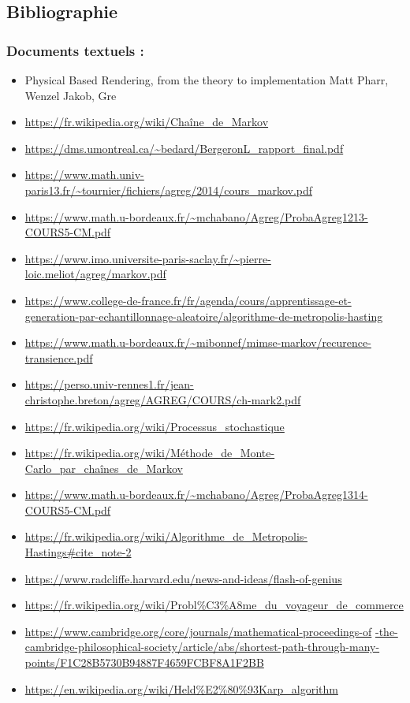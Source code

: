 \documentclass{article}
\begin{document}
\newpage
\subsection{Bibliographie}

\subsubsection{Documents textuels :}
\begin{itemize}
    \item Physical Based Rendering, from the theory to implementation Matt Pharr, Wenzel Jakob, Gre
    \item \url{https://fr.wikipedia.org/wiki/Chaîne_de_Markov}
    \item \url{https://dms.umontreal.ca/~bedard/BergeronL_rapport_final.pdf}
    \item \url{https://www.math.univ-paris13.fr/~tournier/fichiers/agreg/2014/cours_markov.pdf}
    \item \url{https://www.math.u-bordeaux.fr/~mchabano/Agreg/ProbaAgreg1213-COURS5-CM.pdf}
    \item \url{https://www.imo.universite-paris-saclay.fr/~pierre-loic.meliot/agreg/markov.pdf}
    \item \url{https://www.college-de-france.fr/fr/agenda/cours/apprentissage-et-generation-par-echantillonnage-aleatoire/algorithme-de-metropolis-hasting}
    \item \url{https://www.math.u-bordeaux.fr/~mibonnef/mimse-markov/recurence-transience.pdf}
    \item \url{https://perso.univ-rennes1.fr/jean-christophe.breton/agreg/AGREG/COURS/ch-mark2.pdf}
    \item \url{https://fr.wikipedia.org/wiki/Processus_stochastique}
    \item \url{https://fr.wikipedia.org/wiki/Méthode_de_Monte-Carlo_par_chaînes_de_Markov}
    \item \url{https://www.math.u-bordeaux.fr/~mchabano/Agreg/ProbaAgreg1314-COURS5-CM.pdf}
    \item \url{https://fr.wikipedia.org/wiki/Algorithme_de_Metropolis-Hastings#cite_note-2}
    \item \url{https://www.radcliffe.harvard.edu/news-and-ideas/flash-of-genius}
    \item \url{https://fr.wikipedia.org/wiki/Probl\%C3\%A8me_du_voyageur_de_commerce}
    \item \url{https://www.cambridge.org/core/journals/mathematical-proceedings-of} \url{-the-cambridge-philosophical-society/article/abs/shortest-path-through-many-points/F1C28B5730B94887F4659FCBF8A1F2BB} \\ %
    \item \url{https://en.wikipedia.org/wiki/Held%E2%80%93Karp_algorithm}
\end{itemize}
\end{document}
